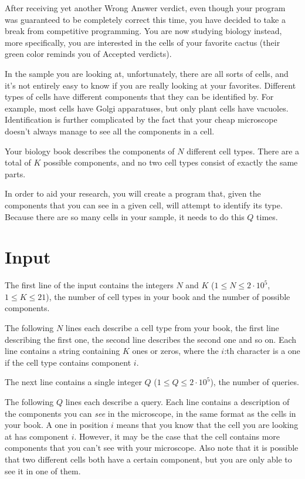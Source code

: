 \noindent
After receiving yet another Wrong Answer verdict, even though your program was guaranteed to be completely correct
this time, you have decided to take a break from competitive programming. You are now studying biology instead, more
specifically, you are interested in the cells of your favorite cactus (their green color reminds you of Accepted verdicts).

In the sample you are looking at, unfortunately, there are all sorts of cells, and it's not entirely easy to
know if you are really looking at your favorites. Different types of cells have different components that they
can be identified by. For example, most cells have Golgi apparatuses, but only plant cells have vacuoles.
Identification is further complicated by the fact that your cheap microscope doesn't always manage to see all the components in a cell.

Your biology book describes the components of $N$ different cell types. There are a total of $K$ possible
components, and no two cell types consist of exactly the same parts.

In order to aid your research, you will create a program that, given the components that you can see in a given cell,
will attempt to identify its type.
Because there are so many cells in your sample, it needs to do this $Q$ times.

\section*{Input}
The first line of the input contains the integers $N$ and $K$ ($1 \leq N \leq 2 \cdot 10^5$, $1 \leq K \leq 21$),
the number of cell types in your book and the number of possible components.

The following $N$ lines each describe a cell type from your book, the first line describing the first one, 
the second line describes the second one and so on. Each line contains a string containing $K$ ones or zeros,
where the $i$:th character is a one if the cell type contains component $i$.

The next line contains a single integer $Q$ ($1 \leq Q \leq 2\cdot 10^5$), the number of queries.

The following $Q$ lines each describe a query. Each line contains a description of the components you can \textit{see}
in the microscope, in the same format as the cells in your book. A one in position $i$ means that you know that the cell
you are looking at has component $i$. However, it may be the case that the cell contains more components that you can't
see with your microscope. Also note that it is possible that two different cells both have a certain component, but
you are only able to see it in one of them.


